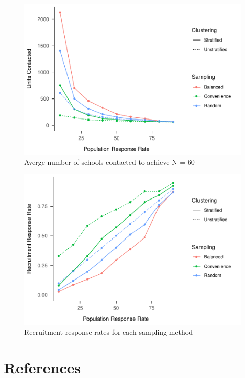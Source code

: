 \documentclass[man,floatsintext]{apa6}
\begin{document}
\begin{figure}
\centering
\includegraphics{GenSamp_Results_files/figure-latex/fig-units-contacted-1.pdf}
\caption{\label{fig:fig-units-contacted}Averge number of schools contacted to achieve N = 60}
\end{figure}

\begin{figure}
\centering
\includegraphics{GenSamp_Results_files/figure-latex/fig-response-rates-1.pdf}
\caption{\label{fig:fig-response-rates}Recruitment response rates for each sampling method}
\end{figure}

\newpage

\hypertarget{references}{%
\section{References}\label{references}}

\begingroup
\setlength{\parindent}{-0.5in}
\setlength{\leftskip}{0.5in}

\hypertarget{refs}{}

\endgroup
\end{document}
